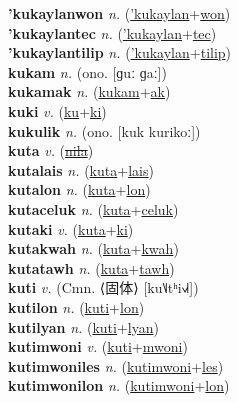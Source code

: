 \textbf{'kukaylanwon} \textit{n.} (\hyperref['kukaylan]{'kukaylan}+\hyperref[won]{won})
 \label{'kukaylanwon} \\
\textbf{'kukaylantec} \textit{n.} (\hyperref['kukaylan]{'kukaylan}+\hyperref[tec]{tec})
 \label{'kukaylantec} \\
\textbf{'kukaylantilip} \textit{n.} (\hyperref['kukaylan]{'kukaylan}+\hyperref[tilip]{tilip})
 \label{'kukaylantilip} \\
\textbf{kukam} \textit{n.} (ono. [ɡuː ɡaː])
 \label{kukam} \\
\textbf{kukamak} \textit{n.} (\hyperref[kukam]{kukam}+\hyperref[ak]{ak})
 \label{kukamak} \\
\textbf{kuki} \textit{v.} (\hyperref[ku]{ku}+\hyperref[ki]{ki})
 \label{kuki} \\
\textbf{kukulik} \textit{n.} (ono. [kuk kurikoː])
 \label{kukulik} \\
\textbf{kuta} \textit{v.} (\hyperref[nila]{\sout{nila}})
 \label{kuta} \\
\textbf{kutalais} \textit{n.} (\hyperref[kuta]{kuta}+\hyperref[lais]{lais})
 \label{kutalais} \\
\textbf{kutalon} \textit{n.} (\hyperref[kuta]{kuta}+\hyperref[lon]{lon})
 \label{kutalon} \\
\textbf{kutaceluk} \textit{n.} (\hyperref[kuta]{kuta}+\hyperref[celuk]{celuk})
 \label{kutaceluk} \\
\textbf{kutaki} \textit{v.} (\hyperref[kuta]{kuta}+\hyperref[ki]{ki})
 \label{kutaki} \\
\textbf{kutakwah} \textit{n.} (\hyperref[kuta]{kuta}+\hyperref[kwah]{kwah})
 \label{kutakwah} \\
\textbf{kutatawh} \textit{n.} (\hyperref[kuta]{kuta}+\hyperref[tawh]{tawh})
 \label{kutatawh} \\
\textbf{kuti} \textit{v.} (Cmn. ⟨固体⟩ [ku˥˩tʰi˧˩˧])
 \label{kuti} \\
\textbf{kutilon} \textit{n.} (\hyperref[kuti]{kuti}+\hyperref[lon]{lon})
 \label{kutilon} \\
\textbf{kutilyan} \textit{n.} (\hyperref[kuti]{kuti}+\hyperref[lyan]{lyan})
 \label{kutilyan} \\
\textbf{kutimwoni} \textit{v.} (\hyperref[kuti]{kuti}+\hyperref[mwoni]{mwoni})
 \label{kutimwoni} \\
\textbf{kutimwoniles} \textit{n.} (\hyperref[kutimwoni]{kutimwoni}+\hyperref[les]{les})
 \label{kutimwoniles} \\
\textbf{kutimwonilon} \textit{n.} (\hyperref[kutimwoni]{kutimwoni}+\hyperref[lon]{lon})
